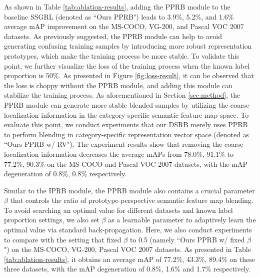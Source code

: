 \documentclass[lettersize,journal]{IEEEtran}
\begin{document}
As shown in Table \ref{tab:ablation-results}, adding the PPRB module to the baseline SSGRL (denoted as ``Ours PPRB") leads to 3.9\%, 5.2\%, and 1.6\% average mAP improvement on the MS-COCO, VG-200, and Pascal VOC 2007 datasets. As previously suggested, the PPRB module can help to avoid generating confusing training samples by introducing more robust representation prototypes, which make the training process be more stable. To validate this point, we further visualize the loss of the training process when the known label proportion is 50\%. As presented in Figure \ref{fig:loss-result}, it can be observed that the loss is choppy without the PPRB module, and adding this module can stabilize the training process. As aforementioned in Section \ref{sec:method}, the PPRB module can generate more stable blended samples by utilizing the coarse localization information in the category-specific semantic feature map space. To evaluate this point, we conduct experiments that our DSRB merely uses PPRB to perform blending in category-specific representation vector space (denoted as ``Ours PPRB w/ RV"). The experiment results show that removing the coarse localization information decreases the average mAPs from 78.0\%, 91.1\% to 77.2\%, 90.3\% on the MS-COCO and Pascal VOC 2007 datasets, with the mAP degeneration of 0.8\%, 0.8\% respectively. 

Similar to the IPRB module, the PPRB module also contains a crucial parameter $\beta$ that controls the ratio of prototype-perspective semantic feature map blending. To avoid searching an optimal value for different datasets and known label proportion settings, we also set $\beta$ as a learnable parameter to adaptively learn the optimal value via standard back-propagation. Here, we also conduct experiments to compare with the setting that fixed $\beta$ to 0.5 (namely ``Ours PPRB w/ fixed $\beta$") on the MS-COCO, VG-200, Pascal VOC 2007 datasets. As presented in Table \ref{tab:ablation-results}, it obtains an average mAP of 77.2\%, 43.3\%, 89.4\% on these three datasets, with the mAP degeneration of 0.8\%, 1.6\% and 1.7\% respectively. 
\end{document}
